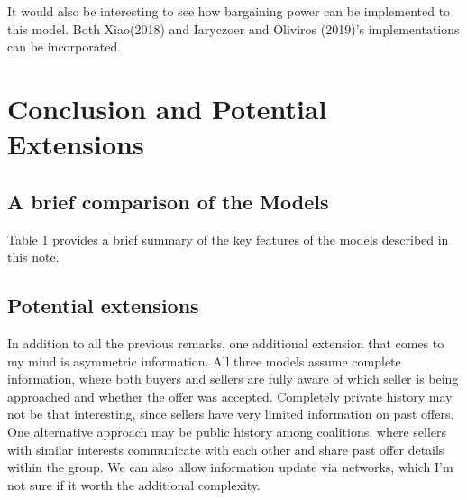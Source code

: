 \documentclass[ProjectGAZ]{subfiles}
\begin{document}
It would also be interesting to see how bargaining power can be implemented to this model. Both Xiao(2018) and Iaryczoer and Oliviros (2019)'s implementations can be incorporated.

\section{Conclusion and Potential Extensions}

\subsection{A brief comparison of the Models}

Table 1 provides a brief summary of the key features of the models described in this note.


\subsection{Potential extensions}

In addition to all the previous remarks, one additional extension that comes to my mind is asymmetric information. All three models assume complete information, where both buyers and sellers are fully aware of which seller is being approached and whether the offer was accepted.
Completely private history may not be that interesting, since sellers have very limited information on past offers. One alternative approach may be public history among coalitions, where sellers with similar interests communicate with each other and share past offer details within the group. We can also allow information update via networks, which I'm not sure if it worth the additional complexity.


\newpage

\cite{Cai03}
\cite{CnZSeqVB}
\cite{InOCoHoldUP}
\cite{Xiao}


\onlyinsubfile{}
%
\end{document}
